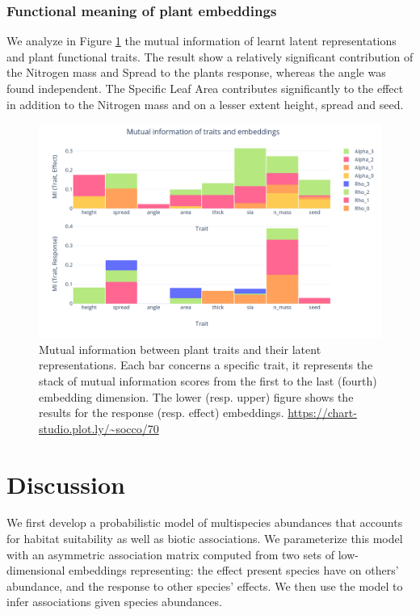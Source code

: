 \documentclass[]{article}
\begin{document}
\subsubsection{Functional meaning of plant embeddings}
We analyze in Figure \ref{mitraitemb} the mutual information of learnt latent representations and plant functional traits. The result show a relatively significant contribution of the Nitrogen mass and Spread to the plants response, whereas the angle was found independent. The Specific Leaf Area contributes significantly to the effect in addition to the Nitrogen mass and on a lesser extent height, spread and seed. \\  

\begin{figure}[h]
	\includegraphics[scale=0.25]{mi_trait_embeddings}
	\caption{Mutual information between plant traits and their latent representations. Each bar concerns a specific trait, it represents the stack of mutual information scores from the first to the last (fourth) embedding dimension. The lower (resp. upper) figure shows the results for the response (resp. effect) embeddings. \url{https://chart-studio.plot.ly/~socco/70}} \label{mitraitemb}
\end{figure}

\section{Discussion}
We first develop a probabilistic model of multispecies abundances that accounts for habitat suitability as well as biotic associations. We parameterize this model with an asymmetric association matrix computed from two sets of low-dimensional embeddings representing: the effect present species have on others' abundance, and the response to other species' effects. We then use the model to infer associations given species abundances. \\
\end{document}
